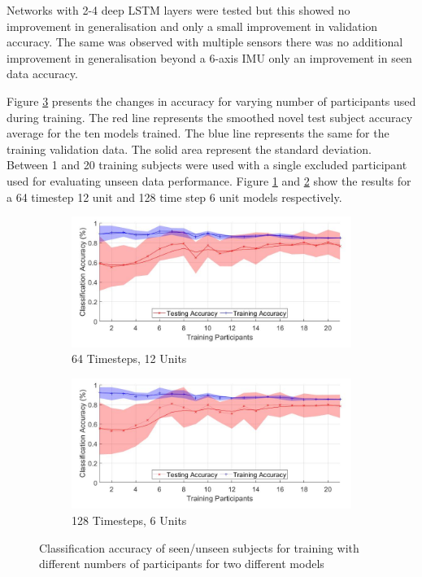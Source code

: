 \documentclass[sensors,article,submit,moreauthors,pdftex]{Definitions/mdpi}
\begin{document}
Networks with 2-4 deep LSTM layers were tested but this showed no improvement in generalisation and only a small improvement in validation accuracy. The same was observed with multiple sensors there was no additional improvement in generalisation beyond a 6-axis IMU only an improvement in seen data accuracy.

Figure \ref{fig:subject_num_generalisation} presents the changes in accuracy for varying number of participants used during training. The red line represents the smoothed novel test subject accuracy average for the ten models trained. The blue line represents the same for the training validation data. The solid area represent the standard deviation. Between 1 and 20 training subjects were used with a single excluded participant used for evaluating unseen data performance. Figure \ref{fig:subject_num_generalisation_64x12} and \ref{fig:subject_num_generalisation_128x6} show the results for a 64 timestep 12 unit and 128 time step 6 unit models respectively.

\begin{figure}[!htb]
    \centering
    \begin{subfigure}[b]{0.49\textwidth}
         \centering
        \includegraphics[width=\textwidth]{Figures/results/number_participants_64x12.jpg}
        \caption{64 Timesteps, 12 Units}
        \label{fig:subject_num_generalisation_64x12}
    \end{subfigure}
    \hfil
    \begin{subfigure}[b]{0.49\textwidth}
         \centering
        \includegraphics[width=\textwidth]{Figures/results/number_participants_128x6.jpg}
        \caption{128 Timesteps, 6 Units}
        \label{fig:subject_num_generalisation_128x6}
    \end{subfigure}
    \caption{Classification accuracy of seen/unseen subjects for training with different numbers of participants for two different models}
    \label{fig:subject_num_generalisation}
\end{figure}
\end{document}
